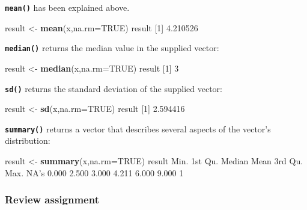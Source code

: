 \documentclass[
]{book}
\newenvironment{Shaded}{\begin{snugshade}}{\end{snugshade}}
\newcommand{\DataTypeTok}[1]{\textcolor[rgb]{0.13,0.29,0.53}{#1}}
\newcommand{\DecValTok}[1]{\textcolor[rgb]{0.00,0.00,0.81}{#1}}
\newcommand{\FloatTok}[1]{\textcolor[rgb]{0.00,0.00,0.81}{#1}}
\newcommand{\KeywordTok}[1]{\textcolor[rgb]{0.13,0.29,0.53}{\textbf{#1}}}
\newcommand{\NormalTok}[1]{#1}
\newcommand{\OtherTok}[1]{\textcolor[rgb]{0.56,0.35,0.01}{#1}}
\newcommand{\StringTok}[1]{\textcolor[rgb]{0.31,0.60,0.02}{#1}}
\begin{document}
\textbf{\texttt{mean()}} has been explained above.

\begin{Shaded}
\begin{Highlighting}[]
\NormalTok{result <-}\StringTok{ }\KeywordTok{mean}\NormalTok{(x,}\DataTypeTok{na.rm=}\OtherTok{TRUE}\NormalTok{)}
\NormalTok{result}
\NormalTok{[}\DecValTok{1}\NormalTok{] }\FloatTok{4.210526}
\end{Highlighting}
\end{Shaded}

\textbf{\texttt{median()}} returns the median value in the supplied vector:

\begin{Shaded}
\begin{Highlighting}[]
\NormalTok{result <-}\StringTok{ }\KeywordTok{median}\NormalTok{(x,}\DataTypeTok{na.rm=}\OtherTok{TRUE}\NormalTok{)}
\NormalTok{result}
\NormalTok{[}\DecValTok{1}\NormalTok{] }\DecValTok{3}
\end{Highlighting}
\end{Shaded}

\textbf{\texttt{sd()}} returns the standard deviation of the supplied vector:

\begin{Shaded}
\begin{Highlighting}[]
\NormalTok{result <-}\StringTok{ }\KeywordTok{sd}\NormalTok{(x,}\DataTypeTok{na.rm=}\OtherTok{TRUE}\NormalTok{)}
\NormalTok{result}
\NormalTok{[}\DecValTok{1}\NormalTok{] }\FloatTok{2.594416}
\end{Highlighting}
\end{Shaded}

\textbf{\texttt{summary()}} returns a vector that describes several aspects of the vector's distribution:

\begin{Shaded}
\begin{Highlighting}[]
\NormalTok{result <-}\StringTok{ }\KeywordTok{summary}\NormalTok{(x,}\DataTypeTok{na.rm=}\OtherTok{TRUE}\NormalTok{)}
\NormalTok{result}
\NormalTok{   Min. 1st Qu.  Median    Mean 3rd Qu.    Max.    NA}\StringTok{'s }
\StringTok{  0.000   2.500   3.000   4.211   6.000   9.000       1 }
\end{Highlighting}
\end{Shaded}

\hypertarget{review-assignment-4}{%
\subsubsection*{Review assignment}\label{review-assignment-4}}
\end{document}
